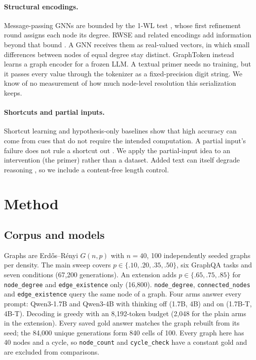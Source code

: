 \documentclass[11pt]{article}
\newcommand{\task}[1]{\texttt{#1}}
\begin{document}
\paragraph{Structural encodings.} Message-passing GNNs are bounded by the
1-WL test \citep{xu2019powerful}, whose first refinement round assigns each
node its degree. RWSE and related encodings add information beyond that
bound \citep{dwivedi2022graph,rampasek2022recipe}. A GNN receives them as
real-valued vectors, in which small differences between nodes of equal
degree stay distinct. GraphToken \citep{perozzi2024letyourgraph} instead
learns a graph encoder for a frozen LLM. A textual primer needs no training,
but it passes every value through the tokenizer as a fixed-precision digit
string. We know of no measurement of how much node-level resolution this
serialization keeps.

\paragraph{Shortcuts and partial inputs.} Shortcut learning
\citep{geirhos2020shortcut} and hypothesis-only baselines
\citep{gururangan2018annotation,poliak2018hypothesis} show that high accuracy
can come from cues that do not require the intended computation. A partial
input's failure does not rule a shortcut out \citep{feng2019misleading}. We
apply the partial-input idea to an intervention (the primer) rather than a
dataset. Added text can itself degrade reasoning
\citep{shi2023distracted,levy2024sametask}, so we include a content-free
length control.

\section{Method}

\subsection{Corpus and models}
\label{sec:corpus}

Graphs are Erd\H{o}s--R\'enyi $G(n,p)$
\citep{erdosrenyi1959random,gilbert1959random} with $n{=}40$, 100
independently seeded graphs per density. The main sweep covers
$p\in\{.10,.20,.35,.50\}$, six GraphQA tasks and seven conditions (67,200
generations). An extension adds $p\in\{.65,.75,.85\}$ for \task{node\_degree}
and \task{edge\_existence} only (16,800). \task{node\_degree},
\task{connected\_nodes} and \task{edge\_existence} query the same node of a
graph. Four arms answer every prompt: Qwen3-1.7B and Qwen3-4B
\citep{qwen2025qwen3} with thinking off (1.7B, 4B) and on (1.7B-T, 4B-T).
Decoding is greedy with an 8,192-token budget (2,048 for the plain arms in the
extension). Every saved gold answer matches the graph rebuilt from its
seed; the 84,000 unique generations form 840 cells of 100. Every graph here has 40 nodes and a cycle, so \task{node\_count} and
\task{cycle\_check} have a constant gold and are excluded from comparisons.
\end{document}

